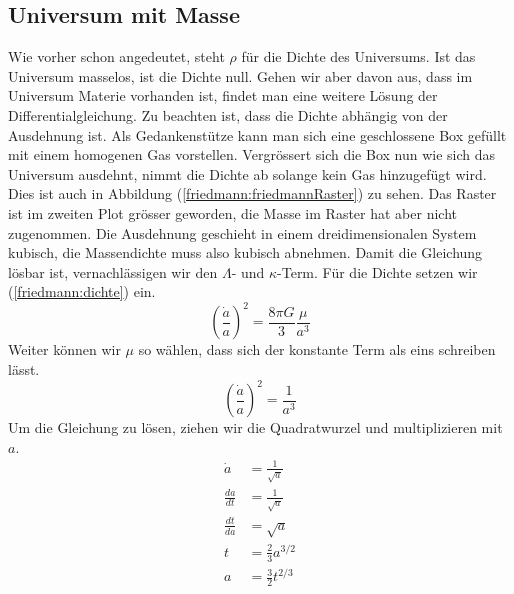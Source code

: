 \begin{refsection}
\subsection{Universum mit Masse}
Wie vorher schon angedeutet, steht $\rho$ für die Dichte des Universums. Ist das Universum masselos, ist die Dichte null. Gehen wir aber davon aus, dass im Universum Materie vorhanden ist, findet man eine weitere Lösung der Differentialgleichung. Zu beachten ist, dass die Dichte abhängig von der Ausdehnung ist. Als Gedankenstütze kann man sich eine geschlossene Box gefüllt mit einem homogenen Gas vorstellen. Vergrössert sich die Box nun wie sich das Universum ausdehnt, nimmt die Dichte ab solange kein Gas hinzugefügt wird. Dies ist auch in Abbildung (\ref{friedmann:friedmannRaster}) zu sehen. Das Raster ist im zweiten Plot grösser geworden, die Masse im Raster hat aber nicht zugenommen. Die Ausdehnung geschieht in einem dreidimensionalen System kubisch, die Massendichte muss also kubisch abnehmen. Damit die Gleichung lösbar ist, vernachlässigen wir den $\Lambda$- und $\kappa$-Term. Für die Dichte setzen wir (\ref{friedmann:dichte}) ein. 
\[\left(\frac{\dot{a}}{a}\right) ^2 = \frac{8 \pi G}{3} \frac{\mu}{a^3}\]
Weiter können wir $\mu$ so wählen, dass sich der konstante Term als eins schreiben lässt.
\[\left(\frac{\dot{a}}{a}\right) ^2 = \frac{1}{a^3}\]
Um die Gleichung zu lösen, ziehen wir die Quadratwurzel und multiplizieren mit $a$.
\begin{align}
	\nonumber \dot{a} &= \frac{1}{\sqrt{a}} \\
	\nonumber \frac{da}{dt} &=\frac{1}{\sqrt{a}} \\
	\nonumber \frac{dt}{da} &= \sqrt{a} \\
	\nonumber t &= \frac{2}{3} a^{3/2} \\
	a &= \frac{3}{2} t^{2/3} \label{friedmann:Masse}
\end{align}


\end{refsection}
